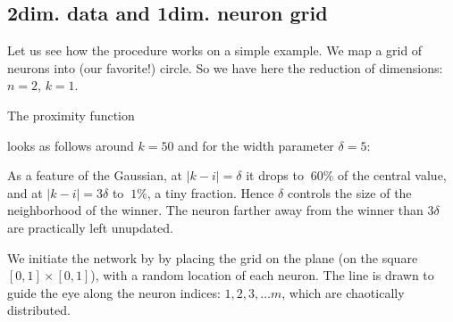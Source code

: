 \documentclass[letterpaper,10pt,english]{jupyterBook}
\begin{document}
\subsection{2\sphinxhyphen{}dim. data and 1\sphinxhyphen{}dim. neuron grid}
\label{\detokenize{docs/som:dim-data-and-1-dim-neuron-grid}}
\sphinxAtStartPar
Let us see how the procedure works on a simple example. We map a grid of  neurons into (our favorite!) circle. So we have here the reduction of dimensions: \(n=2\), \(k=1\).

\begin{sphinxVerbatim}[commandchars=\\\{\}]
 
\end{sphinxVerbatim}

\sphinxAtStartPar
The proximity function

\begin{sphinxVerbatim}[commandchars=\\\{\}]
                        
      
\end{sphinxVerbatim}

\sphinxAtStartPar
looks as follows around \(k=50\) and for the width parameter \(\delta=5\):

\noindent{}

\sphinxAtStartPar
As a feature of the Gaussian, at \(|k-i|=\delta\) it drops to \(~60\%\) of the central value, and at \(|k-i|=3\delta\) to \(~1\%\), a tiny fraction. Hence \(\delta\) controls the size of the neighborhood of the winner. The neuron farther away from the winner than \(3\delta\) are practically left unupdated.

\sphinxAtStartPar
We initiate the network by by placing the grid on the plane (on the square \([0,1]\times [0,1]\)), with a random location of each neuron. The line is drawn to guide the eye along the neuron indices: \(1,2,3,\dots m\),  which are chaotically distributed.

\begin{sphinxVerbatim}[commandchars=\\\{\}]
\PYG{p}{[}    \PYG{p}{]} 
\end{sphinxVerbatim}
\end{document}
